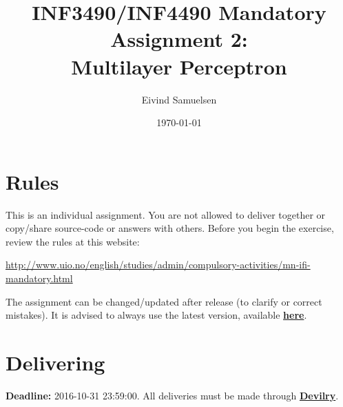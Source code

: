 
\title{\vspace{-2cm}INF3490/INF4490 Mandatory Assignment 2:\\
Multilayer Perceptron}
\author{Eivind Samuelsen}
\date{\today}



    \renewcommand\marginsymbol[1][0pt]{%
  \tabto*{0cm}\makebox[-1cm][c]{$\mathbb{P}$}\tabto*{\TabPrevPos}}

\maketitle
\section*{Rules}
This is an individual assignment.
You are not allowed to deliver together or copy/share source-code or answers with others.
Before you begin the exercise, review the rules at this website:
\begin{center}
\url{http://www.uio.no/english/studies/admin/compulsory-activities/mn-ifi-mandatory.html}
\end{center}


The assignment can be changed/updated after release (to clarify or correct mistakes).
It is advised to always use the latest version, available
 \href{http://www.uio.no/studier/emner/matnat/ifi/INF3490/h16/assignment-2/inf3490-as2.pdf}{\textbf{here}}.

\section*{Delivering}
\textbf{Deadline:} 2016-10-31 23:59:00. All deliveries must be made through
\href{https://devilry.ifi.uio.no}{\textbf{Devilry}}.
